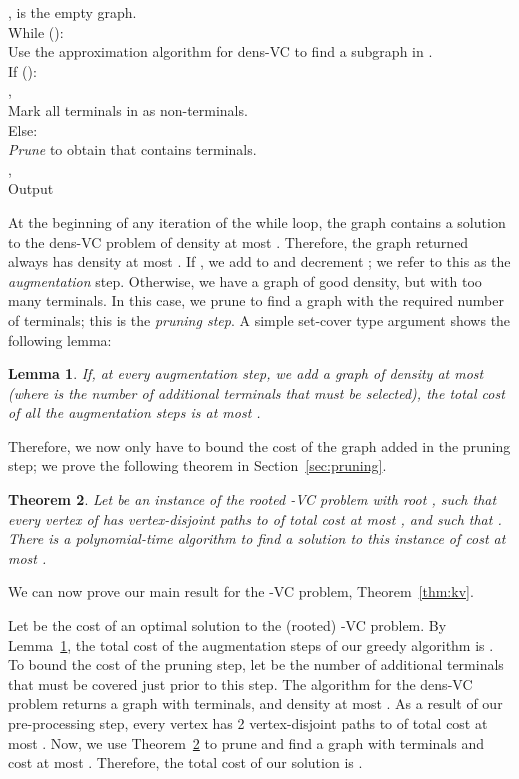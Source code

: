 \documentclass[11pt]{article}
\newtheorem{lemma}{Lemma}[section]
\newtheorem{theorem}[lemma]{Theorem}
\newenvironment{proofof}[1]{\smallskip\noindent{\bf Proof of #1:}}{\hspace*{\fill}\par}
\newcommand{\kvc}[1]{-{\sc VC} }
\newcommand{\kv}{\kvc{2}}
\newcommand{\densV}{dens-{\sc VC} }
\begin{document}
\begin{algo}
  ,  is the empty graph. \\
  While (): \+ \\
  Use the approximation algorithm for \densV to find a subgraph  in .\\
  If (): \+ \\
  ,  \\
  Mark all terminals in  as non-terminals. \- \\
  Else: \+ \\
  {\em Prune}  to obtain  that contains  terminals. \\
  ,  \- \- \\
  Output 
\end{algo}

At the beginning of any iteration of the while loop, the graph contains a
solution to the \densV problem of density at most .
Therefore, the graph  returned always has density at most . If , we add  to  and decrement ;
we refer to this as the \emph{augmentation} step. Otherwise, we have a
graph  of good density, but with too many terminals. In this case, we
prune  to find a graph with the required number of terminals; this is
the \emph{pruning step}. A simple set-cover type argument shows the
following lemma:

\begin{lemma}\label{lem:greedy}
  If, at every augmentation step, we add a graph of density at most
   (where  is the number of
  additional terminals that must be selected), the total cost of all
  the augmentation steps is at most .
\end{lemma}

Therefore, we now only have to bound the cost of the graph  added
in the pruning step; we prove the following theorem in
Section~\ref{sec:pruning}.

\begin{theorem} \label{thm:avekv} Let  be an
  instance of the rooted \kv problem with root , such that every
  vertex of  has  vertex-disjoint paths to  of total cost at
  most , and such that . There is a
  polynomial-time algorithm to find a solution to this instance of
  cost at most .
\end{theorem}

\noindent We can now prove our main result for the \kv problem,
Theorem~\ref{thm:kv}.

\begin{proofof}{Theorem~\ref{thm:kv}}
  Let  be the cost of an optimal solution to the (rooted) \kv
  problem.  By Lemma~\ref{lem:greedy}, the total cost of the
  augmentation steps of our greedy algorithm is . To bound the cost of the pruning step, let  be
  the number of additional terminals that must be covered just prior
  to this step. The algorithm for the \densV problem returns a graph
   with  terminals, and density at most . As a result of our pre-processing step, every
  vertex has 2 vertex-disjoint paths to  of total cost at most
  . Now, we use Theorem~\ref{thm:avekv} to prune  and find a
  graph  with  terminals and cost at most . Therefore, the total cost of our solution is .
\end{proofof}
\end{document}
